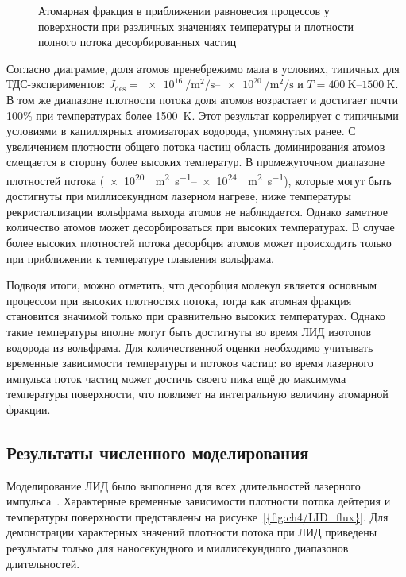 \begin{figure}[ht]
    \caption{Атомарная фракция в приближении равновесия процессов у поверхности при различных значениях температуры и плотности полного потока десорбированных частиц}\label{fig:ch4/atomic_fraction_diagram}
\end{figure}

Согласно диаграмме, доля атомов пренебрежимо мала в условиях, типичных для ТДС-экспериментов: \(J_\mathrm{des} = \SIrange{e16}{e20}{\per\meter\squared\per\second}\) и \( T = \SIrange{400}{1500}{\kelvin} \). В том же диапазоне плотности потока доля атомов возрастает и достигает почти 100\% при температурах более \SI{1500}{\kelvin}. Этот результат коррелирует с типичными условиями в капиллярных атомизаторах водорода, упомянутых ранее. С увеличением плотности общего потока частиц область доминирования атомов смещается в сторону более высоких температур. В промежуточном диапазоне плотностей потока (\SIrange{e20}{e24}{\per\meter\squared\per\second}), которые могут быть достигнуты при миллисекундном лазерном нагреве, ниже температуры рекристаллизации вольфрама выхода атомов не наблюдается. Однако заметное количество атомов может десорбироваться при высоких температурах. В случае более высоких плотностей потока десорбция атомов может происходить только при приближении к температуре плавления вольфрама.

Подводя итоги, можно отметить, что десорбция молекул является основным процессом при высоких плотностях потока, тогда как атомная фракция становится значимой только при сравнительно высоких температурах. Однако такие температуры вполне могут быть достигнуты во время ЛИД изотопов водорода из вольфрама. Для количественной оценки необходимо учитывать временные зависимости температуры и потоков частиц: во время лазерного импульса поток частиц может достичь своего пика ещё до максимума температуры поверхности, что повлияет на интегральную величину атомарной фракции.

\subsection{Результаты численного моделирования}\label{subsec:ch4/seс2/subsec3}

Моделирование ЛИД было выполнено для всех длительностей лазерного импульса~\cite{Kulagin2022b}. Характерные временные зависимости плотности потока дейтерия и температуры поверхности  представлены на рисунке~\cref{{fig:ch4/LID_flux}}. Для демонстрации характерных значений плотности потока при ЛИД приведены результаты только для наносекундного и миллисекундного диапазонов длительностей.

